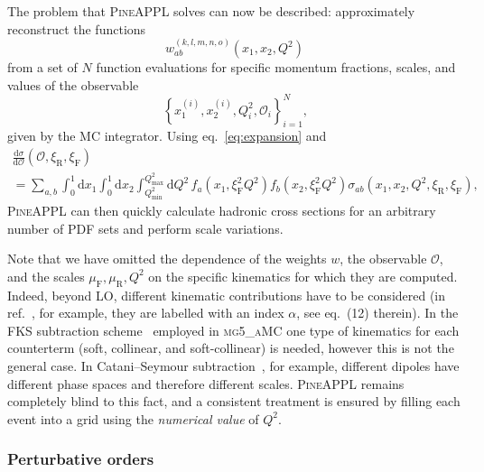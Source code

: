 The problem that \textsc{PineAPPL} solves can now be described: approximately reconstruct the functions
\begin{equation}
w_{ab}^{(k,l,m,n,o)} \left( x_1, x_2, Q^2 \right)
\label{eq:weight-map}
\end{equation}
from a set of $N$ function evaluations for specific momentum fractions, scales, and values of the observable
\begin{equation}
\left\{ x_1^{(i)}, x_2^{(i)}, Q^2_i, \mathcal{O}_i \right\}_{i=1}^N \text{,} \label{eq:phase-space-weights}
\end{equation}
given by the MC integrator.
Using eq.~\eqref{eq:expansion} and
\begin{multline}
\frac{\mathrm{d} \sigma}{\mathrm{d} \mathcal{O}} (\mathcal{O}, \xi_\mathrm{R}, \xi_\mathrm{F}) \\
= \sum_{a,b} \int_0^1 \mathrm{d} x_1 \int_0^1 \mathrm{d} x_2 \int_{Q^2_\mathrm{min}}^{Q^2_\mathrm{max}} \mathrm{d} Q^2 \, f_a (x_1, \xi_\mathrm{F}^2 Q^2) f_b (x_2, \xi_\mathrm{F}^2 Q^2) \sigma_{ab} (x_1, x_2, Q^2, \xi_\mathrm{R}, \xi_\mathrm{F}) \text{,}
\label{eq:pineappl-convolution}
\end{multline}
\textsc{PineAPPL} can then quickly calculate hadronic cross sections for
an arbitrary number of PDF sets and perform scale variations.

Note that we have omitted the dependence of the weights $w$, the observable $\mathcal{O}$, and the scales $\mu_\mathrm{F}, \mu_\mathrm{R}, Q^2$ on the specific kinematics for which they are computed.
Indeed, beyond LO, different kinematic contributions have to be considered (in ref.~\cite{Bertone:2014zva}, for example, they are labelled with an index $\alpha$, see eq.~(12) therein).
In the FKS subtraction scheme~\cite{Frixione:1995ms,Frixione:1997np} employed in \textsc{mg5\_aMC} one type of kinematics for each counterterm (soft, collinear, and soft-collinear) is needed, however this is not the general case.
In Catani--Seymour subtraction~\cite{Catani:1996jh,Catani:2002hc}, for example, different dipoles have different phase spaces and therefore different scales.
\textsc{PineAPPL} remains completely blind to this fact, and a consistent treatment is ensured by filling each event into a grid using the \emph{numerical value} of $Q^2$.

\subsubsection{Perturbative orders}


